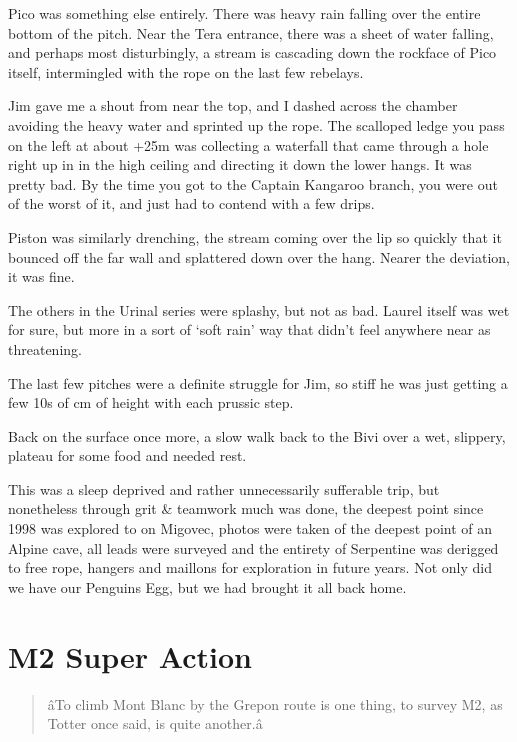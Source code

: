 Pico was something else entirely. There was heavy rain falling over the
entire bottom of the pitch. Near the Tera entrance, there was a sheet of
water falling, and perhaps most disturbingly, a stream is cascading down
the rockface of Pico itself, intermingled with the rope on the last few
rebelays.

Jim gave me a shout from near the top, and I dashed across the chamber
avoiding the heavy water and sprinted up the rope. The scalloped ledge
you pass on the left at about +25m was collecting a waterfall that came
through a hole right up in in the high ceiling and directing it down the
lower hangs. It was pretty bad. By the time you got to the Captain
Kangaroo branch, you were out of the worst of it, and just had to
contend with a few drips.

Piston was similarly drenching, the stream coming over the lip so
quickly that it bounced off the far wall and splattered down over the
hang. Nearer the deviation, it was fine.

The others in the Urinal series were splashy, but not as bad. Laurel
itself was wet for sure, but more in a sort of `soft rain' way that
didn't feel anywhere near as threatening.

The last few pitches were a definite struggle for Jim, so stiff he was
just getting a few 10s of cm of height with each prussic step.

Back on the surface once more, a slow walk back to the Bivi over a wet,
slippery, plateau for some food and needed rest.

This was a sleep deprived and rather unnecessarily sufferable trip, but
nonetheless through grit \& teamwork much was done, the deepest point
since 1998 was explored to on Migovec, photos were taken of the deepest
point of an Alpine cave, all leads were surveyed and the entirety of
Serpentine was derigged to free rope, hangers and maillons for
exploration in future years. Not only did we have our Penguins Egg, but
we had brought it all back home.


\section{M2 Super Action}\label{m2-super-action}

\begin{verse}
âTo climb Mont Blanc by the Grepon route is one thing, to survey M2, as Totter once said, is quite another.â
\end{verse}

